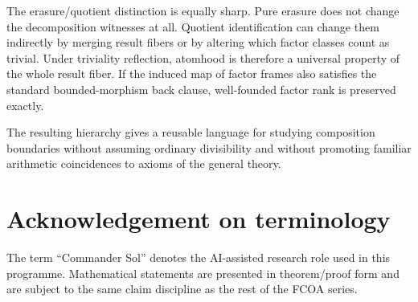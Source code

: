 \documentclass[11pt]{article}
\theoremstyle{definition}
\theoremstyle{remark}
\begin{document}
The erasure/quotient distinction is equally sharp. Pure erasure does not change the decomposition witnesses at all. Quotient identification can change them indirectly by merging result fibers or by altering which factor classes count as trivial. Under triviality reflection, atomhood is therefore a universal property of the whole result fiber. If the induced map of factor frames also satisfies the standard bounded-morphism back clause, well-founded factor rank is preserved exactly.

The resulting hierarchy gives a reusable language for studying composition boundaries without assuming ordinary divisibility and without promoting familiar arithmetic coincidences to axioms of the general theory.

\section*{Acknowledgement on terminology}
The term ``Commander Sol'' denotes the AI-assisted research role used in this programme. Mathematical statements are presented in theorem/proof form and are subject to the same claim discipline as the rest of the FCOA series.



\end{document}

